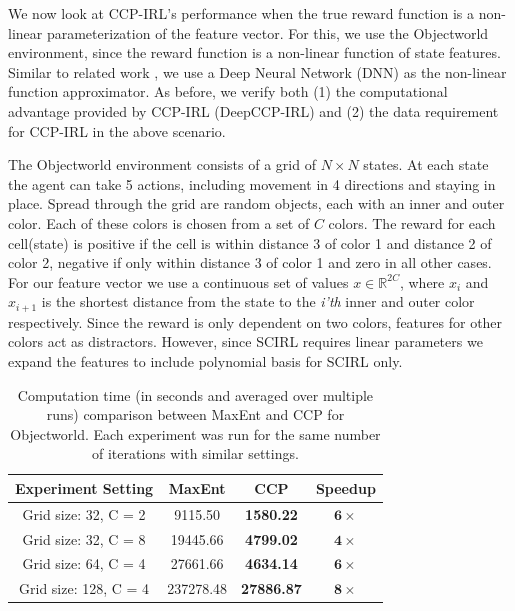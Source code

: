 \documentclass{article}
\begin{document}
We now look at CCP-IRL's performance when the true reward function is a non-linear parameterization of the feature vector.
For this, we use the Objectworld \cite{levine2011nonlinear} environment, since the reward function is a non-linear function of state features.
Similar to related work \cite{wulfmeier2015maximum}, we use a Deep Neural Network (DNN) as the non-linear function approximator.
As before, we verify both (1) the computational advantage provided by CCP-IRL (DeepCCP-IRL) and (2) the data requirement for CCP-IRL in the above scenario.

The Objectworld environment consists of a grid of $N \times N$ states. At each state the agent can take 5 actions, including movement in 4 directions and staying in place. Spread through the grid are random objects, each with an inner and outer color. Each of these colors is chosen from a set of $C$ colors. The reward for each cell(state) is positive if the cell is within distance 3 of color 1 and distance 2 of color 2, negative if only within distance 3 of color 1 and zero in all other cases. For our feature vector we use a continuous set of values $x \in \mathbb{R}^{2C}$, where $x_i$ and $x_{i+1}$ is the shortest distance from the state to the \emph{i'th} inner and outer color respectively. Since the reward is only dependent on two colors, features for other colors act as distractors. However, since SCIRL requires linear parameters we expand the features to include polynomial basis for SCIRL only.

\begin{table}[t]
\centering
\def\arraystretch{1.2}%
\begin{tabular}{|c|c|c|c|}
\hline
Experiment Setting & MaxEnt & CCP & Speedup \\\hline

Grid size: 32, C = 2 & 9115.50 & \textbf{1580.22} & $\mathbf{6}\times$ \\
Grid size: 32, C = 8 & 19445.66 & \textbf{4799.02} & $\mathbf{4}\times$ \\
Grid size: 64, C = 4 & 27661.66 & \textbf{4634.14} & $\mathbf{6}\times$ \\
Grid size: 128, C = 4 & 237278.48 & \textbf{27886.87} & $\mathbf{8}\times$ \\
\hline
\end{tabular}
\caption{Computation time (in seconds and averaged over multiple runs) comparison between MaxEnt and CCP for Objectworld. Each experiment was run for the same number of iterations with similar settings. }
\label{table:table_results_objectworld}
\end{table}
\end{document}
